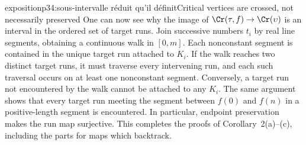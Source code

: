 \begin{dcomment}{exposition}{p34:sous-intervalle réduit qu'il définit}{Critical vertices are crossed, not necessarily preserved}
One can now see why the image of $\Cr(\tau,f)\to\Cr(\upsilon)$ is an interval in the ordered set of target runs. Join successive numbers $t_i$ by real line segments, obtaining a continuous walk in $[0,m]$. Each nonconstant segment is contained in the unique target run attached to $K_i$. If the walk reaches two distinct target runs, it must traverse every intervening run, and each such traversal occurs on at least one nonconstant segment. Conversely, a target run not encountered by the walk cannot be attached to any $K_i$. The same argument shows that every target run meeting the segment between $f(0)$ and $f(n)$ in a positive-length segment is encountered. In particular, endpoint preservation makes the run map surjective. This completes the proofs of Corollary~2(a)--(c), including the parts for maps which backtrack.
\end{dcomment}

